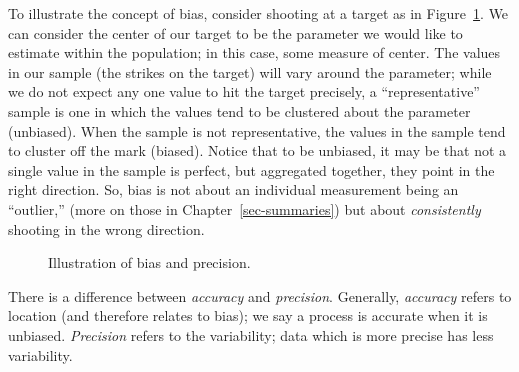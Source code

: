 \documentclass[
  letterpaper,
  DIV=11,
  numbers=noendperiod]{scrreprt}
\theoremstyle{plain}
\theoremstyle{definition}
\theoremstyle{definition}
\theoremstyle{remark}
\begin{document}
To illustrate the concept of bias, consider shooting at a target as in
Figure~\ref{fig-data-bias}. We can consider the center of our target to
be the parameter we would like to estimate within the population; in
this case, some measure of center. The values in our sample (the strikes
on the target) will vary around the parameter; while we do not expect
any one value to hit the target precisely, a ``representative'' sample
is one in which the values tend to be clustered about the parameter
(unbiased). When the sample is not representative, the values in the
sample tend to cluster off the mark (biased). Notice that to be
unbiased, it may be that not a single value in the sample is perfect,
but aggregated together, they point in the right direction. So, bias is
not about an individual measurement being an ``outlier,'' (more on those
in Chapter~\ref{sec-summaries}) but about \emph{consistently} shooting
in the wrong direction.

\begin{figure}


\caption{\label{fig-data-bias}Illustration of bias and precision.}

\end{figure}%

\begin{tcolorbox}[enhanced jigsaw, breakable, titlerule=0mm, colframe=quarto-callout-warning-color-frame, bottomtitle=1mm, opacityback=0, rightrule=.15mm, toptitle=1mm, arc=.35mm, bottomrule=.15mm, left=2mm, title=\textcolor{quarto-callout-warning-color}{\faExclamationTriangle}\hspace{0.5em}{Accuracy vs.~Precision}, leftrule=.75mm, coltitle=black, toprule=.15mm, colbacktitle=quarto-callout-warning-color!10!white, colback=white, opacitybacktitle=0.6]

There is a difference between \emph{accuracy} and \emph{precision}.
Generally, \emph{accuracy} refers to location (and therefore relates to
bias); we say a process is accurate when it is unbiased.
\emph{Precision} refers to the variability; data which is more precise
has less variability.

\end{tcolorbox}
\end{document}
